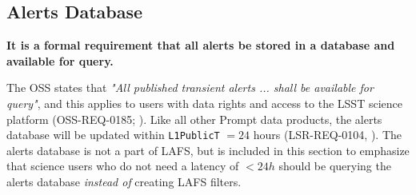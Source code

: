 \documentclass[DM,authoryear,toc]{lsstdoc}
\begin{document}
\subsection{Alerts Database}\label{ssec:LAFS_adb}

{\bf It is a formal requirement that all alerts be stored in a database and available for query.}

The OSS states that {\it "All published transient alerts ... shall be available for query"}, and this applies to users with data rights and access to the LSST science platform (OSS-REQ-0185; ). Like all other Prompt data products, the alerts database will be updated within {\tt L1PublicT} $=24$ hours (LSR-REQ-0104, ). The alerts database is not a part of LAFS, but is included in this section to emphasize that science users who do not need a latency of $<24h$ should be querying the alerts database {\it instead of} creating LAFS filters.


\clearpage


\end{document}
